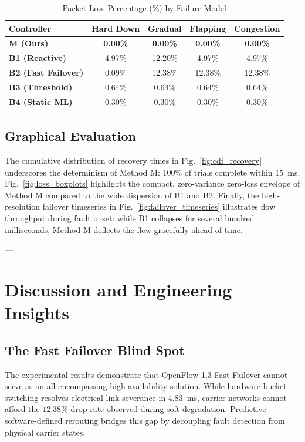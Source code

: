 \documentclass[journal,10pt,twocolumn]{IEEEtran}
\begin{document}
\begin{table}[!t]
\centering
\caption{Packet Loss Percentage (\%) by Failure Model}
\label{tab:fault_loss}
\begin{tabular}{lcccc}
\toprule
\textbf{Controller} & \textbf{Hard Down} & \textbf{Gradual} & \textbf{Flapping} & \textbf{Congestion} \\
\midrule
\textbf{M (Ours)} & \textbf{0.00\%} & \textbf{0.00\%} & \textbf{0.00\%} & \textbf{0.00\%} \\
\textbf{B1 (Reactive)} & 4.97\% & 12.20\% & 4.97\% & 4.97\% \\
\textbf{B2 (Fast Failover)} & 0.09\% & 12.38\% & 12.38\% & 12.38\% \\
\textbf{B3 (Threshold)} & 0.64\% & 0.64\% & 0.64\% & 0.64\% \\
\textbf{B4 (Static ML)} & 0.30\% & 0.30\% & 0.30\% & 0.30\% \\
\bottomrule
\end{tabular}
\end{table}

\subsection{Graphical Evaluation}
The cumulative distribution of recovery times in Fig.~\ref{fig:cdf_recovery} underscores the determinism of Method M: 100\% of trials complete within $15$~ms. Fig.~\ref{fig:loss_boxplots} highlights the compact, zero-variance zero-loss envelope of Method M compared to the wide dispersion of B1 and B2. Finally, the high-resolution failover timeseries in Fig.~\ref{fig:failover_timeseries} illustrates flow throughput during fault onset: while B1 collapses for several hundred milliseconds, Method M deflects the flow gracefully ahead of time.

---

\section{Discussion and Engineering Insights}
\label{sec:discussion}

\subsection{The Fast Failover Blind Spot}
The experimental results demonstrate that OpenFlow 1.3 Fast Failover cannot serve as an all-encompassing high-availability solution. While hardware bucket switching resolves electrical link severance in $4.83$~ms, carrier networks cannot afford the $12.38\%$ drop rate observed during soft degradation. Predictive software-defined rerouting bridges this gap by decoupling fault detection from physical carrier states.
\end{document}
